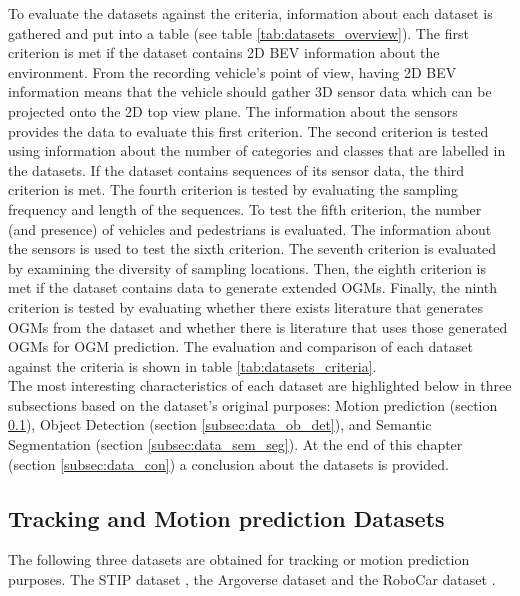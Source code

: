 To evaluate the datasets against the criteria, information about each dataset is gathered and put into a table (see table \ref{tab:datasets_overview}). The first criterion is met if the dataset contains 2D \gls{BEV} information about the environment. From the recording vehicle's point of view, having 2D \gls{BEV} information means that the vehicle should gather 3D sensor data which can be projected onto the 2D top view plane. The information about the sensors provides the data to evaluate this first criterion. The second criterion is tested using information about the number of categories and classes that are labelled in the datasets. If the dataset contains sequences of its sensor data, the third criterion is met. The fourth criterion is tested by evaluating the sampling frequency and length of the sequences. To test the fifth criterion, the number (and presence) of vehicles and pedestrians is evaluated. The information about the sensors is used to test the sixth criterion. The seventh criterion is evaluated by examining the diversity of sampling locations. Then, the eighth criterion is met if the dataset contains data to generate extended \glspl{OGM}. Finally, the ninth criterion is tested by evaluating whether there exists literature that generates \glspl{OGM} from the dataset and whether there is literature that uses those generated \glspl{OGM} for \gls{OGM} prediction. The evaluation and comparison of each dataset against the criteria is shown in table \ref{tab:datasets_criteria}. \\

The most interesting characteristics of each dataset are highlighted below in three subsections based on the dataset's original purposes: Motion prediction (section \ref{subsec:data_track_mot}), Object Detection (section \ref{subsec:data_ob_det}), and Semantic Segmentation (section \ref{subsec:data_sem_seg}). At the end of this chapter (section \ref{subsec:data_con}) a conclusion about the datasets is provided.


\subsection{Tracking and Motion prediction Datasets} \label{subsec:data_track_mot}
The following three datasets are obtained for tracking or motion prediction purposes. The \gls{STIP} dataset \cite{liu2020spatiotemporal}, the Argoverse dataset \cite{chang2019argoverse} and the RoboCar dataset \cite{robotcardatasetijrr}. \\

